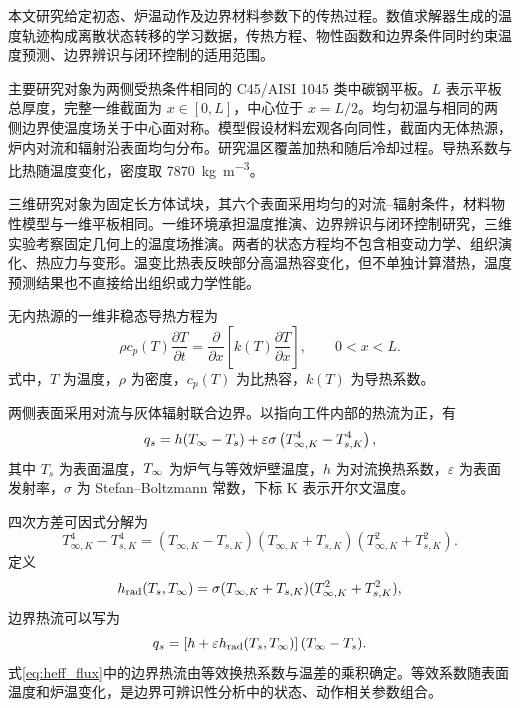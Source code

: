 
本文研究给定初态、炉温动作及边界材料参数下的传热过程。数值求解器生成的温度轨迹构成离散状态转移的学习数据，传热方程、物性函数和边界条件同时约束温度预测、边界辨识与闭环控制的适用范围。


主要研究对象为两侧受热条件相同的 C45/AISI 1045 类中碳钢平板。$L$ 表示平板总厚度，完整一维截面为 $x\in[0,L]$，中心位于 $x=L/2$。均匀初温与相同的两侧边界使温度场关于中心面对称。模型假设材料宏观各向同性，截面内无体热源，炉内对流和辐射沿表面均匀分布。研究温区覆盖加热和随后冷却过程。导热系数与比热随温度变化，密度取 \SI{7870}{\kilogram\per\cubic\metre}。

三维研究对象为固定长方体试块，其六个表面采用均匀的对流--辐射条件，材料物性模型与一维平板相同。一维环境承担温度推演、边界辨识与闭环控制研究，三维实验考察固定几何上的温度场推演。两者的状态方程均不包含相变动力学、组织演化、热应力与变形。温变比热表反映部分高温热容变化，但不单独计算潜热，温度预测结果也不直接给出组织或力学性能。


无内热源的一维非稳态导热方程为
\begin{equation}
  \rho c_p(T)\frac{\partial T}{\partial t}
  =\frac{\partial}{\partial x}\left[k(T)\frac{\partial T}{\partial x}\right],
  \qquad 0<x<L.
  \label{eq:heat_pde}
\end{equation}
式中，$T$ 为温度，$\rho$ 为密度，$c_p(T)$ 为比热容，$k(T)$ 为导热系数。

两侧表面采用对流与灰体辐射联合边界。以指向工件内部的热流为正，有
\begin{equation}
  q_s=h({T_{\infty}}-T_s)
  +\varepsilon\sigma\left(T_{\infty,K}^{4}-T_{s,K}^{4}\right),
  \label{eq:mixed_boundary}
\end{equation}
其中 $T_s$ 为表面温度，${T_{\infty}}$ 为炉气与等效炉壁温度，$h$ 为对流换热系数，$\varepsilon$ 为表面发射率，$\sigma$ 为 Stefan--Boltzmann 常数，下标 K 表示开尔文温度。

四次方差可因式分解为
\begin{equation}
  T_{\infty,K}^{4}-T_{s,K}^{4}
  =(T_{\infty,K}-T_{s,K})(T_{\infty,K}+T_{s,K})
  (T_{\infty,K}^{2}+T_{s,K}^{2}).
\end{equation}
定义
\begin{equation}
  h_{\mathrm{rad}}(T_s,{T_{\infty}})
  =\sigma(T_{\infty,K}+T_{s,K})(T_{\infty,K}^{2}+T_{s,K}^{2}),
  \label{eq:hrad}
\end{equation}
边界热流可以写为
\begin{equation}
  q_s=\left[h+\varepsilon h_{\mathrm{rad}}(T_s,{T_{\infty}})\right]({T_{\infty}}-T_s).
  \label{eq:heff_flux}
\end{equation}
式\eqref{eq:heff_flux}中的边界热流由等效换热系数与温差的乘积确定。等效系数随表面温度和炉温变化，是边界可辨识性分析中的状态、动作相关参数组合。

